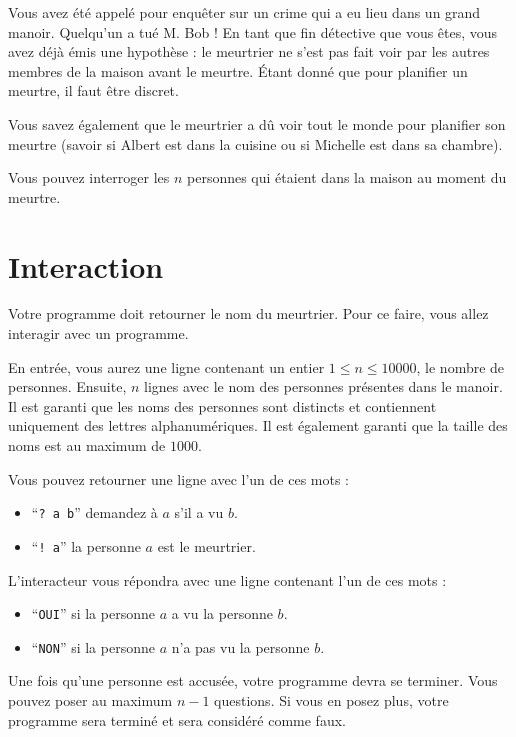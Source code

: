 \problemname{\problemyamlname}


\newcommand{\maxn}{10^4}  %

Vous avez été appelé pour enquêter sur un crime qui a eu lieu dans un grand manoir. Quelqu'un a tué M. Bob ! En tant que fin détective que vous êtes, vous avez déjà émis une hypothèse : le meurtrier ne s'est pas fait voir par les autres membres de la maison avant le meurtre. Étant donné que pour planifier un meurtre, il faut être discret.

Vous savez également que le meurtrier a dû voir tout le monde pour planifier son meurtre (savoir si Albert est dans la cuisine ou si Michelle est dans sa chambre).

Vous pouvez interroger les $n$ personnes qui étaient dans la maison au moment du meurtre.

\section*{Interaction}
Votre programme doit retourner le nom du meurtrier. Pour ce faire, vous allez interagir avec un programme.

En entrée, vous aurez une ligne contenant un entier $1 \le n \le 10000$, le nombre de personnes.
Ensuite, $n$ lignes avec le nom des personnes présentes dans le manoir. Il est garanti que les noms des personnes sont distincts et contiennent uniquement des lettres alphanumériques. Il est également garanti que la taille des noms est au maximum de $1000$.

Vous pouvez retourner une ligne avec l'un de ces mots :

\begin{itemize}
    \item ``\texttt{? a b}'' demandez à $a$ s'il a vu $b$.
    \item ``\texttt{! a}'' la personne $a$ est le meurtrier.
\end{itemize}

L'interacteur vous répondra avec une ligne contenant l'un de ces mots :

\begin{itemize}
    \item ``\texttt{OUI}'' si la personne $a$ a vu la personne $b$.
    \item ``\texttt{NON}'' si la personne $a$ n'a pas vu la personne $b$.
\end{itemize}

Une fois qu'une personne est accusée, votre programme devra se terminer.
Vous pouvez poser au maximum $n - 1$ questions. Si vous en posez plus, votre programme sera terminé et sera considéré comme faux.
